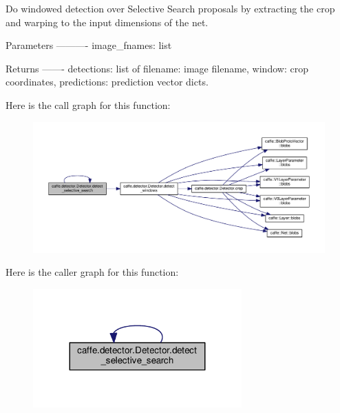 \begin{DoxyVerb}Do windowed detection over Selective Search proposals by extracting
the crop and warping to the input dimensions of the net.

Parameters
----------
image_fnames: list

Returns
-------
detections: list of {filename: image filename, window: crop coordinates,
    predictions: prediction vector} dicts.
\end{DoxyVerb}
 Here is the call graph for this function\+:
\nopagebreak
\begin{figure}[H]
\begin{center}
\leavevmode
\includegraphics[width=350pt]{classcaffe_1_1detector_1_1_detector_a2d96c53701abd37152c5f078a18ebf08_cgraph}
\end{center}
\end{figure}
Here is the caller graph for this function\+:
\nopagebreak
\begin{figure}[H]
\begin{center}
\leavevmode
\includegraphics[width=227pt]{classcaffe_1_1detector_1_1_detector_a2d96c53701abd37152c5f078a18ebf08_icgraph}
\end{center}
\end{figure}
\mbox{\label{classcaffe_1_1detector_1_1_detector_a2d96c53701abd37152c5f078a18ebf08}} 
